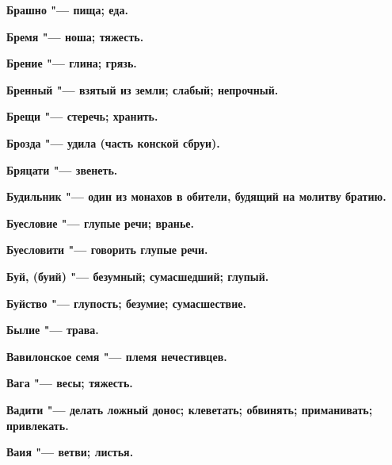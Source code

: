 \bfseries Брашно \normalfont{} "--- пища; еда. 




\bfseries Бремя \normalfont{} "--- ноша; тяжесть. 




\bfseries Брение \normalfont{} "--- глина; грязь. 




\bfseries Бренный \normalfont{} "--- взятый из земли; слабый; непрочный. 




\bfseries Брещи \normalfont{} "--- стеречь; хранить. 




\bfseries Брозда \normalfont{} "--- удила (часть конской сбруи). 




\bfseries Бряцати \normalfont{} "--- звенеть. 




\bfseries Будильник \normalfont{} "--- один из монахов в обители, будящий на молитву братию. 




\bfseries Буесловие \normalfont{} "--- глупые речи; вранье. 




\bfseries Буесловити \normalfont{} "--- говорить глупые речи. 




\bfseries Буй, (буий) \normalfont{} "--- безумный; сумасшедший; глупый. 




\bfseries Буйство \normalfont{} "--- глупость; безумие; сумасшествие. 




\bfseries Былие \normalfont{} "--- трава. 




 





\bfseries Вавилонское семя \normalfont{} "--- племя нечестивцев. 




\bfseries Вага \normalfont{} "--- весы; тяжесть. 




\bfseries Вадити \normalfont{} "--- делать ложный донос; клеветать; обвинять; приманивать; привлекать. 




\bfseries Ваия \normalfont{} "--- ветви; листья. 




